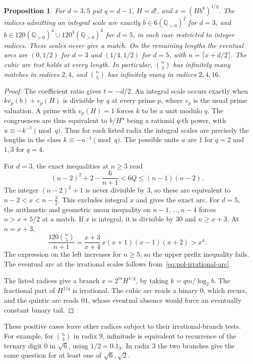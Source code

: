 \documentclass[11pt,reqno,a4paper]{amsart}
\newtheorem{proposition}[theorem]{Proposition}
\theoremstyle{remark}
\begin{document}
\begin{proposition}\label{prop:pol-pascal-prefix}
For \(d=3,5\) put \(q=d-1\), \(H=d!\), and \(x=(H b^k)^{1/q}\).
The radices admitting an integral scale are exactly
\(b\in 6(\mathbb Q_{>0})^2\) for \(d=3\), and
\(b\in 120(\mathbb Q_{>0})^4\cup120^3(\mathbb Q_{>0})^4\)
for \(d=5\), in each case restricted to integer radices.
These scales never give a match. On the remaining lengths the
eventual arcs are \((0,1/2)\) for \(d=3\) and \((1/4,1/2)\)
for \(d=5\), with \(n=\lceil x+d/2\rceil\). The cubic arc test
holds at every length. In particular, \(\binom n3\) has
infinitely many matches in radices \(2,4\), and \(\binom n5\)
has infinitely many in radices \(2,4,16\).
\end{proposition}
\begin{proof}
The coefficient ratio gives \(t=-d/2\).
An integral scale occurs exactly when \(k v_p(b)+v_p(H)\)
is divisible by \(q\) at every prime \(p\), where \(v_p\) is
the usual prime valuation. A prime with \(v_p(H)=1\) forces
\(k\) to be a unit modulo \(q\). The congruences are thus
equivalent to \(b/H^u\) being a rational \(q\)-th power,
with \(u\equiv-k^{-1}\pmod q\). Thus for each listed radix
the integral scales are precisely the lengths in the class
\(k\equiv-u^{-1}\pmod q\). The possible units \(u\) are \(1\)
for \(q=2\) and \(1,3\) for \(q=4\).

For \(d=3\), the exact inequalities at \(n\ge3\) read
\[
 (n-2)^2+2-\frac{6}{n+1}<6Q\le(n-1)(n-2).
\]
The integer \((n-2)^2+1\) is never divisible by \(3\), so
these are equivalent to \(n-2<x<n-\tfrac32\). This excludes
integral \(x\) and gives the exact arc. For \(d=5\), the
arithmetic and geometric mean inequality on \(n-1,\ldots,n-4\)
forces \(n>x+5/2\) at a match. If \(x\) is integral, it is
divisible by \(30\) and \(n\ge x+3\). At \(n=x+3\),
\[
 \frac{120\binom n5}{n+1}
 =\frac{x+3}{x+4}\,x(x+1)(x-1)(x+2)>x^4.
\]
The expression on the left increases for \(n\ge5\), so
the upper prefix inequality fails. The eventual arc at the
irrational scales follows from~\eqref{eq:pol-irrational-arc}.

The listed radices give a branch \(x=2^m H^{1/q}\), by taking
\(k=qm/\log_2 b\). The fractional part of \(H^{1/q}\)
is irrational. The cubic arc reads a binary \(0\), which
recurs, and the quintic arc reads \(01\), whose eventual
absence would force an eventually constant binary tail.
\end{proof}

These positive cases leave other radices subject to their
irrational-branch tests. For example, for \(\binom n3\) in
radix \(9\), infinitude is equivalent to recurrence of the
ternary digit \(0\) in \(\sqrt6\), using
\(1/2=0.\overline{1}_3\). In radix \(3\) the two branches give
the same question for at least one of \(\sqrt6,\sqrt2\).
\end{document}
